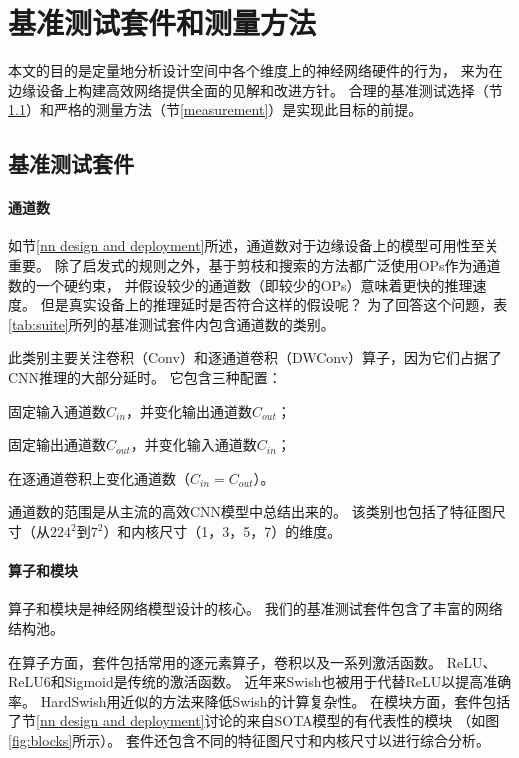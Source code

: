 \section{基准测试套件和测量方法}
\label{methodology}
本文的目的是定量地分析设计空间中各个维度上的神经网络硬件的行为，
来为在边缘设备上构建高效网络提供全面的见解和改进方针。
合理的基准测试选择（节\ref{suite}）和严格的测量方法（节\ref{measurement}）是实现此目标的前提。

\subsection{基准测试套件}
\label{suite}


\paragraph{通道数}
如节\ref{nn design and deployment}所述，通道数对于边缘设备上的模型可用性至关重要。
除了启发式的规则之外，基于剪枝和搜索的方法都广泛使用OPs作为通道数的一个硬约束，
并假设较少的通道数（即较少的OPs）意味着更快的推理速度。
但是真实设备上的推理延时是否符合这样的假设呢？
为了回答这个问题，表\ref{tab:suite}所列的基准测试套件内包含通道数的类别。

此类别主要关注卷积（Conv）和逐通道卷积（DWConv）算子，因为它们占据了CNN推理的大部分延时。
它包含三种配置：
\begin{enumerate*}[label=(\alph*)]
    \item 固定输入通道数$C_{in}$，并变化输出通道数$C_{out}$；
    \item 固定输出通道数$C_{out}$，并变化输入通道数$C_{in}$；
    \item 在逐通道卷积上变化通道数（$C_{in}=C_{out}$）。
\end{enumerate*}
通道数的范围是从主流的高效CNN模型中总结出来的。
该类别也包括了特征图尺寸（从$224^2$到$7^2$）和内核尺寸（1，3，5，7）的维度。

\paragraph{算子和模块}
算子和模块是神经网络模型设计的核心。
我们的基准测试套件包含了丰富的网络结构池。

在算子方面，套件包括常用的逐元素算子，卷积以及一系列激活函数。
ReLU、ReLU6和Sigmoid是传统的激活函数。
近年来Swish\cite{ramachandran2017swish}也被用于代替ReLU以提高准确率。
HardSwish用近似的方法来降低Swish的计算复杂性。
在模块方面，套件包括了节\ref{nn design and deployment}讨论的来自SOTA模型的有代表性的模块
（如图\ref{fig:blocks}所示）。
套件还包含不同的特征图尺寸和内核尺寸以进行综合分析。


